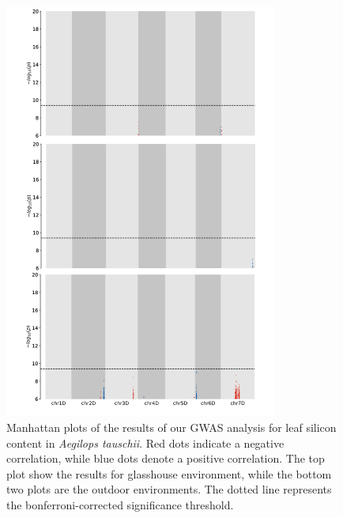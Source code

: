 \documentclass[12pt, letterpaper, ]{report}
\begin{document}
\begin{figure}[h]
        \centering
        \includegraphics[width=0.8\textwidth]{images/gwas_plots/svgtopng/si_manhattan_plots.png}
        \caption{Manhattan plots of the results of our GWAS analysis for leaf silicon content in \textit{Aegilops tauschii}. Red dots indicate a negative correlation, while blue dots denote a positive correlation. The top plot show the results for glasshouse environment, while the bottom two plots are the outdoor environments. The dotted line represents the bonferroni-corrected significance threshold.}
        \label{Fig:si_peak_plot}
\end{figure}
\end{document}
